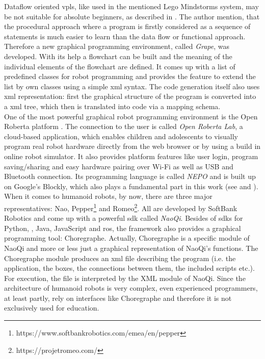 Dataflow oriented \glspl{vpl}, like used in the mentioned Lego Mindstorms system, may be not suitable for absolute beginners, as described in \cite{Grape}. The author mention, that the procedural approach where a program is firstly considered as a sequence of statements is much easier to learn than the data flow or functional approach. Therefore a new graphical programming environment, called \textit{Grape}, was developed. With its help a flowchart can be built and the meaning of the individual elements of the flowchart are defined. It comes up with a list of predefined classes for robot programming and provides the feature to extend the list by own classes using a simple \gls{xml} syntax. The code generation itself also uses \gls{xml} representation: first the graphical structure of the program is converted into a \gls{xml} tree, which then is translated into \Cpp{} code via a mapping schema. \\

One of the most powerful graphical robot programming environment is the Open Roberta platform \cite{OpenRoberta}. The connection to the user is called \textit{Open Roberta Lab}, a cloud-­based application, which enables children and adolescents to visually program real robot hardware directly from the web browser or by using a build in online robot simulator. It also provides platform features like user login, program saving/sharing and easy hardware pairing over Wi-Fi as well as USB and Bluetooth connection.\cite{Ketterl_Jost_Leimbach_Budde_2015} Its programming language is called \textit{NEPO} and is built up on Google's Blockly, which also plays a fundamental part in this work (see  and ). \\

When it comes to humanoid robots, by now, there are three major representatives: Nao\cite{Nao5152516}, Pepper\footnote{https://www.softbankrobotics.com/emea/en/pepper} and Romeo\footnote{https://projetromeo.com/}. All are developed by SoftBank Robotics and come up with a powerful \gls{sdk} called \textit{NaoQi}. Besides of \glspl{sdk} for Python, \Cpp{}, Java, JavaScript and \gls{ros}, the framework also provides a graphical programming tool: Choregraphe\cite{Choregraphe5326209}. Actually, Choregraphe is a specific module of NaoQi and more or less just a graphical representation of NaoQi's functions. The Choregraphe module produces an \gls{xml} file describing the program (i.e. the application, the boxes, the connections between them, the included scripts etc.). For execution, the file is interpreted by the XML module of NaoQi. Since the architecture of humanoid robots is very complex, even experienced programmers, at least partly, rely on interfaces like Choregraphe and therefore it is not exclusively used for education. \\

